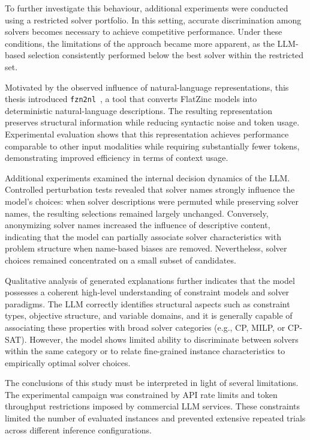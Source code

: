 \documentclass[../../main]{subfiles}
\begin{document}
To further investigate this behaviour, additional experiments were conducted using a restricted solver portfolio. In this setting, accurate discrimination among solvers becomes necessary to achieve competitive performance. Under these conditions, the limitations of the approach became more apparent, as the LLM-based selection consistently performed below the best solver within the restricted set.

Motivated by the observed influence of natural-language representations, this thesis introduced \texttt{fzn2nl}~\cite{fzn2nl}, a tool that converts FlatZinc models into deterministic natural-language descriptions. The resulting representation preserves structural information while reducing syntactic noise and token usage. Experimental evaluation shows that this representation achieves performance comparable to other input modalities while requiring substantially fewer tokens, demonstrating improved efficiency in terms of context usage.

Additional experiments examined the internal decision dynamics of the LLM. Controlled perturbation tests revealed that solver names strongly influence the model's choices: when solver descriptions were permuted while preserving solver names, the resulting selections remained largely unchanged. Conversely, anonymizing solver names increased the influence of descriptive content, indicating that the model can partially associate solver characteristics with problem structure when name-based biases are removed. Nevertheless, solver choices remained concentrated on a small subset of candidates.

Qualitative analysis of generated explanations further indicates that the model possesses a coherent high-level understanding of constraint models and solver paradigms. The LLM correctly identifies structural aspects such as constraint types, objective structure, and variable domains, and it is generally capable of associating these properties with broad solver categories (e.g., CP, MILP, or CP-SAT). However, the model shows limited ability to discriminate between solvers within the same category or to relate fine-grained instance characteristics to empirically optimal solver choices.

The conclusions of this study must be interpreted in light of several limitations. The experimental campaign was constrained by API rate limits and token throughput restrictions imposed by commercial LLM services. These constraints limited the number of evaluated instances and prevented extensive repeated trials across different inference configurations.
\end{document}
